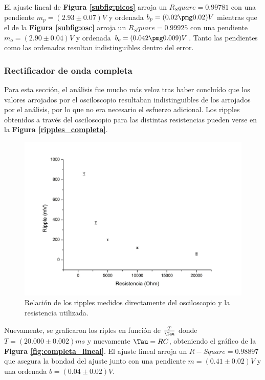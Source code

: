 \documentclass[11pt,a4paper]{article}
\begin{document}
El ajuste lineal de \textbf{Figura \ref{subfig:picos}} arroja un $R_Square = 0.99781$ con una pendiente $m_p = (2.93 \pm 0.07)V$ y ordenada $b_p = (0.02 \pmg 0.02)V$ mientras que el de la \textbf{Figura \ref{subfig:osc}} arroja un $R_Square = 0.99925$ con una pendiente $m_o = (2.90 \pm 0.04)V$ y ordenada $b_o = (0.042 \pmg 0.009)V$. Tanto las pendientes como las ordenadas resultan indistinguibles dentro del error. 


\subsubsection{Rectificador de onda completa}

Para esta sección, el análisis fue mucho más veloz tras haber concluído que los valores arrojados por el osciloscopio resultaban indistinguibles de los arrojados por el análisis, por lo que no era necesario el esfuerzo adicional. Los ripples obtenidos a través del osciloscopio para las distintas resistencias pueden verse en la \textbf{Figura \ref{ripples_completa}}.

\begin{figure}[H]
\centering
\includegraphics[scale=0.5]{ripples_completa}
   \caption{Relación de los ripples medidos directamente del osciloscopio y la resistencia utilizada.}
   \label{fig:ripples_completa}
\end{figure}

Nuevamente, se graficaron los riples en función de $\frac{T}{\Tau}$ donde $T = (20.000 \pm 0.002)ms$ y nuevamente $\Tau = RC$, obteniendo el gráfico de la \textbf{Figura \ref{fig:completa_lineal}}. El ajuste lineal arroja un $R-Square = 0.98897$ que asegura la bondad del ajuste junto con una pendiente $m = (0.41 \pm 0.02)V$ y una ordenada $b = (0.04 \pm 0.02)V$. 
\end{document}
